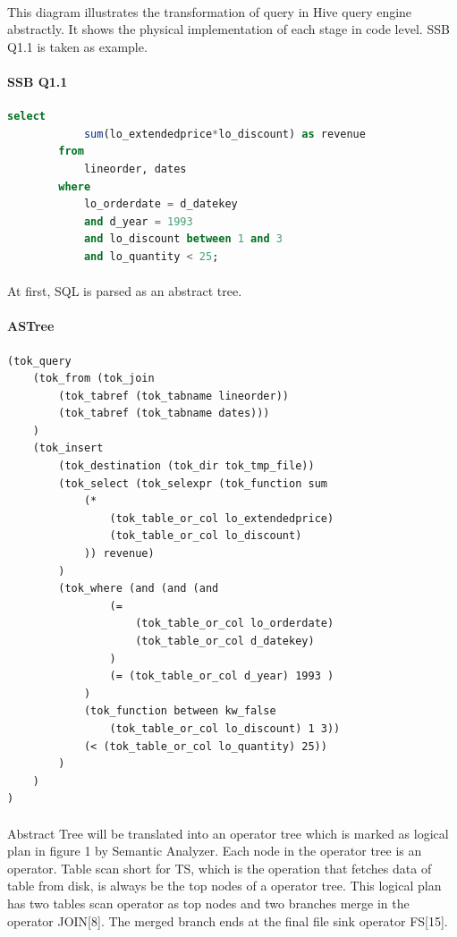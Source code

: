         \paragraph{}
        This diagram illustrates the transformation of query in Hive query engine abstractly. It shows the physical implementation of each stage in code level. 
        SSB\cite{ssb} Q1.1 is taken as example.
        \paragraph*{SSB Q1.1}
        \begin{lstlisting}[language={SQL},%frame=shadowbox,    
            keywordstyle=\color{blue!30!black},  
            basicstyle=\ttfamily]  
        select 
            sum(lo_extendedprice*lo_discount) as revenue
        from 
            lineorder, dates
        where 
            lo_orderdate = d_datekey
            and d_year = 1993
            and lo_discount between 1 and 3
            and lo_quantity < 25;
        \end{lstlisting} 
        \paragraph{}
        At first, SQL is parsed as an abstract tree.
        \paragraph*{ASTree}
        \begin{lstlisting}[language={},%frame=shadowbox,    
            keywordstyle=\color{blue!30!black},  
            basicstyle=\ttfamily]  
(tok_query 
    (tok_from (tok_join 
        (tok_tabref (tok_tabname lineorder)) 
        (tok_tabref (tok_tabname dates)))
    ) 
    (tok_insert 
        (tok_destination (tok_dir tok_tmp_file)) 
        (tok_select (tok_selexpr (tok_function sum 
            (* 
                (tok_table_or_col lo_extendedprice) 
                (tok_table_or_col lo_discount)
            )) revenue)
        ) 
        (tok_where (and (and (and 
                (= 
                    (tok_table_or_col lo_orderdate) 
                    (tok_table_or_col d_datekey)
                ) 
                (= (tok_table_or_col d_year) 1993 )
            ) 
            (tok_function between kw_false 
                (tok_table_or_col lo_discount) 1 3)) 
            (< (tok_table_or_col lo_quantity) 25))
        )
    )
)
        \end{lstlisting}
        \paragraph{}
        Abstract Tree will be translated into an operator tree which is marked as logical plan in figure 1 by 
        Semantic Analyzer. Each node in the operator tree is an operator. Table scan short for TS,  which is 
        the operation that fetches data of table from disk, is always be the top nodes of a operator tree. This 
        logical plan has two tables scan operator as top nodes and two branches merge in the operator JOIN[8]. 
        The merged branch ends at the final file sink operator FS[15].
